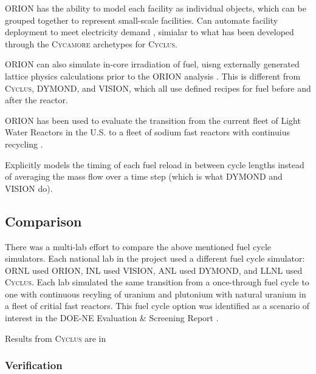 \documentclass{article}
\newcommand{\Cyclus}{\textsc{Cyclus}\xspace}%
\newcommand{\Cycamore}{\textsc{Cycamore}\xspace}%
\begin{document}
    ORION has the ability to model each facility 
    as individual objects, which can be grouped together to represent small-scale 
    facilities. Can automate facility deployment to meet electricity demand
    \cite{feng_standardized_2016}, simialar to what has been developed through 
    the \Cycamore archetypes for \Cyclus \cite{scopatz_cyclus_2015}.  

    ORION can also simulate in-core irradiation of fuel, uisng externally 
    generated lattice physics calculations prior to the ORION analysis
    \cite{feng_standardized_2016}. This is different from \Cyclus, 
    DYMOND, and VISION, which all use defined recipes for fuel before 
    and after the reactor. 

    ORION has been used to evaluate the transition from the current fleet of 
    Light Water Reactors in the U.S. to a fleet of sodium fast reactors with 
    continuius recycling \cite{sunny_transition_2015}.

    Explicitly models the timing of each fuel reload in between cycle lengths 
    instead of averaging the mass flow over a time step (which 
    is what DYMOND and VISION do)\cite{feng_standardized_2016}.


    
    \subsection{Comparison}
    There was a multi-lab effort to compare the above mentioned fuel cycle 
    simulators. Each national lab in the project used a different 
    fuel cycle simulator: \gls{ORNL} used ORION, \gls{INL} used 
    \gls{VISION}, \gls{ANL} used \gls{DYMOND}, and \gls{LLNL} used
    \Cyclus. Each lab simulated the same transition from a once-through 
    fuel cycle to one with continuous recyling of uranium and plutonium 
    with natural uranium in a fleet of critial fast reactors. This 
    fuel cycle option was identified as a scenario of interest in the 
    \gls{DOE-NE} Evaluation \& Screening Report \cite{wigeland_nuclear_2014}.
    
    Results from \Cyclus are in \cite{djokic_application_2015}


    \subsubsection{Verification}
\end{document}
